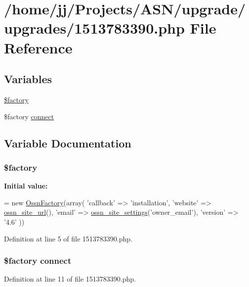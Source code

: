 \hypertarget{1513783390_8php}{}\section{/home/jj/\+Projects/\+A\+S\+N/upgrade/upgrades/1513783390.php File Reference}
\label{1513783390_8php}
\subsection*{Variables}
\begin{DoxyCompactItemize}
\item 
\hyperlink{1513783390_8php_a099b374dc664ee043fffcd6ea05e3e70}{\$factory}
\item 
\$factory \hyperlink{1513783390_8php_a3fdbedd7713e458f25fcf7dc1f562a3d}{connect}
\end{DoxyCompactItemize}


\subsection{Variable Documentation}
\subsubsection[{\texorpdfstring{\$factory}{$factory}}]{\setlength{\rightskip}{0pt plus 5cm}\$factory}\hypertarget{1513783390_8php_a099b374dc664ee043fffcd6ea05e3e70}{}\label{1513783390_8php_a099b374dc664ee043fffcd6ea05e3e70}
{\bfseries Initial value\+:}
\begin{DoxyCode}
= \textcolor{keyword}{new} \hyperlink{class_ossn_factory}{OssnFactory}(array(
        \textcolor{stringliteral}{'callback'} => \textcolor{stringliteral}{'installation'},
        \textcolor{stringliteral}{'website'} => \hyperlink{ossn_8lib_8system_8php_a2f12f9244f99eccd1225afb76ef2ab65}{ossn\_site\_url}(),
        \textcolor{stringliteral}{'email'} => \hyperlink{ossn_8lib_8system_8php_a610e2045b8a86c09f777b4d82e24e34c}{ossn\_site\_settings}(\textcolor{stringliteral}{'owner\_email'}),
        \textcolor{stringliteral}{'version'} => \textcolor{stringliteral}{'4.6'}
))
\end{DoxyCode}


Definition at line 5 of file 1513783390.\+php.

\subsubsection[{\texorpdfstring{connect}{connect}}]{\setlength{\rightskip}{0pt plus 5cm}\$factory connect}\hypertarget{1513783390_8php_a3fdbedd7713e458f25fcf7dc1f562a3d}{}\label{1513783390_8php_a3fdbedd7713e458f25fcf7dc1f562a3d}


Definition at line 11 of file 1513783390.\+php.

